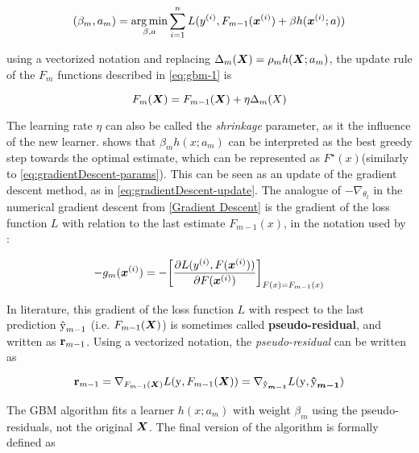 \begin{equation*}
    (\beta_m, a_m) = \operatorname*{arg\,min}_{\beta, a} \sum_{i=1}^n L(y^{(i)}, F_{m-1}(\bm{x}^{(i)}) + \beta h(\bm{x}^{(i)}; a))
\end{equation*}

\noindent using a vectorized notation and replacing $\Delta_m(\bm{X}) =\rho_m h(\bm{X}; a_m)$,  the update rule of the $F_m$ functions described in \ref{eq:gbm-1} is

\begin{equation}\label{eq:gbm-eta}
    F_m(\bm{X}) = F_{m-1}(\bm{X}) + \eta \Delta_m(X)
\end{equation}

\noindent The learning rate $\eta$ can also be called the \textit{shrinkage} parameter, as it  the influence of the new learner. \cite{gbmdef} shows that $\beta_mh(x; a_m)$ can be interpreted as the best greedy step towards the optimal estimate, which can be represented as $F^\star(x)$(similarly to \ref{eq:gradientDescent-params}). This can be seen as an update of the gradient descent method, as in \ref{eq:gradientDescent-update}. The analogue of $-\nabla_{\theta_{t}}$ in the numerical gradient descent from \ref{Gradient Descent} is the gradient of the loss function $L$ with relation to the last estimate $F_{m-1}(x)$, in the notation used by \cite{gbmdef}:

\begin{equation*}
    -g_m(\bm{x}^{(i)}) = -\bigg[\frac{\partial L(y^{(i)}, F(\bm{x}^{(i)}))}{\partial F(\bm{x}^{(i)})}\bigg]_{F(x)=F_{m-1}(x)}
\end{equation*}

\noindent In literature, this gradient of the loss function $L$ with respect to the last prediction $\hat{{\text{\textup{y}}}}_{m-1}$ (i.e. $F_{m-1}(\bm{X})$) is sometimes called \textbf{pseudo-residual}, and written as $\textbf{{\text{\textup{r}}}}_{m-1}$. Using a vectorized notation, the \textit{pseudo-residual} can be written as

\begin{equation*}
    \textbf{{\text{\textup{r}}}}_{m-1} = \nabla_{F_{m-1}(\bm{X})}L(\bm{\text{\textup{y}}}, F_{m-1}(\bm{X})) = \nabla_{\bm{\hat{{\text{\textup{y}}}}_{m-1}}}L(\bm{\text{\textup{y}}},\bm{\hat{{\text{\textup{y}}}}_{m-1}})
\end{equation*}


\noindent The GBM algorithm fits a learner $h(x; a_m)$ with weight $\beta_m$ using the pseudo-residuals, not the original $\bm{X}$. The final version of the algorithm is formally defined as

